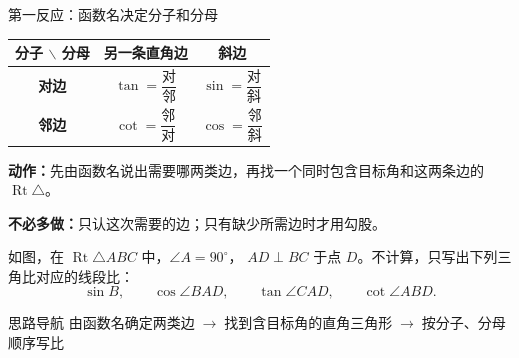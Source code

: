 \documentclass{exam-zh}
\begin{document}


\begin{eduSolutionBox}{第一反应：函数名决定分子和分母}
  \begingroup
  \setlength{\parskip}{2.5mm}
\renewcommand{\arraystretch}{1.55}
\begin{center}
\begin{tabular}{c|c|c}
\textbf{分子 $\backslash$ 分母} & \textbf{另一条直角边} & \textbf{斜边} \\
\hline
\textbf{对边} & $\tan=\dfrac{\text{对}}{\text{邻}}$ & $\sin=\dfrac{\text{对}}{\text{斜}}$ \\
\hline
\textbf{邻边} & $\cot=\dfrac{\text{邻}}{\text{对}}$ & $\cos=\dfrac{\text{邻}}{\text{斜}}$
\end{tabular}
\end{center}
\par
\textbf{动作：}先由函数名说出需要哪两类边，再找一个同时包含目标角和这两条边的 $\operatorname{Rt}\triangle$。\par
\textbf{不必多做：}只认这次需要的边；只有缺少所需边时才用勾股。\par
  \endgroup
\end{eduSolutionBox}




\begin{eduProblemBlock}[反应卡]
\noindent
\begin{minipage}[t]{\dimexpr\linewidth-70mm-6mm\relax}
\vspace{0pt}
如图，在 $\operatorname{Rt}\triangle ABC$ 中，$\angle A=90^\circ$，
$AD\perp BC$ 于点 $D$。不计算，只写出下列三角比对应的线段比：
\[
\sin B,\qquad \cos\angle BAD,\qquad
\tan\angle CAD,\qquad \cot\angle ABD.
\]

\end{minipage}\hfill
\begin{diagramcoltikz}{70mm}{每看到一个函数名，先说要找哪两类边，再圈对应的直角三角形。}
}
\end{diagramcoltikz}
\end{eduProblemBlock}





\begin{eduAuxItem}{思路导航}
由函数名确定两类边$\;\to\;$找到含目标角的直角三角形$\;\to\;$按分子、分母顺序写比\end{eduAuxItem}
\end{document}

